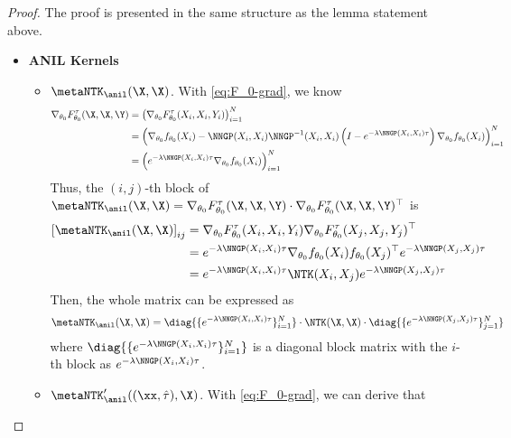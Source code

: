 \documentclass{article}
\begin{document}
\begin{proof} The proof is presented in the same structure as the lemma statement above.
\begin{itemize}[leftmargin=*,align=left,noitemsep,nolistsep]
    \item \textbf{ANIL Kernels}
    \begin{itemize}[leftmargin=*,align=left,noitemsep,nolistsep]
        \item $\metaNTK_\anil(\X,\X)$. With \eqref{eq:F_0-grad}, we know
        \begin{align}
            \nabla_{\theta_0} F^\tau_{\theta_0}(\X,\X,\Y) &= \left(\nabla_{\theta_0} F^\tau_{\theta_0}(X_i,X_i,Y_i) \right)_{i=1}^N \nonumber\\
            &= \left(\nabla_{\theta_0} f_{\theta_0}(X_i) - \NNGP(X_i,X_i)\NNGP^{-1}(X_i,X_i)\left(I - e^{-\lambda \NNGP(X_i,X_i)\tau}\right) \nabla_{\theta_0} f_{\theta_0}(X_i) \right)_{i=1}^N\nonumber \\
            &=\left(e^{-\lambda \NNGP(X_i,X_i)\tau} \nabla_{\theta_0} f_{\theta_0}(X_i) \right)_{i=1}^N
\end{align}
        Thus, the $(i,j)$-th block of $\metaNTK_\anil(\X,\X) = \nabla_{\theta_0} F^\tau_{\theta_0}(\X,\X,\Y) \cdot  \nabla_{\theta_0} F^\tau_{\theta_0}(\X,\X,\Y)^\top$ is
        \begin{align}
            \left[\metaNTK_\anil(\X,\X)\right]_{ij} &= \nabla_{\theta_0} F^\tau_{\theta_0}(X_i,X_i,Y_i) \nabla_{\theta_0} F^\tau_{\theta_0}(X_j,X_j,Y_j)^\top \nonumber \\
            &= e^{-\lambda \NNGP(X_i,X_i)\tau} \nabla_{\theta_0} f_{\theta_0}(X_i) f_{\theta_0}(X_j)^\top  e^{-\lambda \NNGP(X_j,X_j)\tau} \nonumber \\
            & = e^{-\lambda \NNGP(X_i,X_i)\tau} \NTK(X_i,X_j)  e^{-\lambda \NNGP(X_j,X_j)\tau}
        \end{align}
        Then, the whole matrix can be expressed as
        \begin{align}\label{eq:anil-kernel:supp}
            \metaNTK_\anil(\X,\X) = \diag{\{e^{-\lambda \NNGP(X_i,X_i)\tau}\}_{i=1}^N}\cdot \NTK(\X,\X) \cdot \diag{\{e^{-\lambda \NNGP(X_j,X_j)\tau} \}_{j=1}^N}
        \end{align}
        where $\diag{\{e^{-\lambda \NNGP(X_i,X_i)\tau}\}_{i=1}^N}$ is a diagonal block matrix with the $i$-th block as $e^{-\lambda \NNGP(X_i,X_i)\tau}$.
        \item $\metaNTK_\anil'((\xx,\hat\tau),\X)$. With \eqref{eq:F_0-grad}, we can derive that 

\end{itemize}
\end{itemize}
\end{proof}
\end{document}
